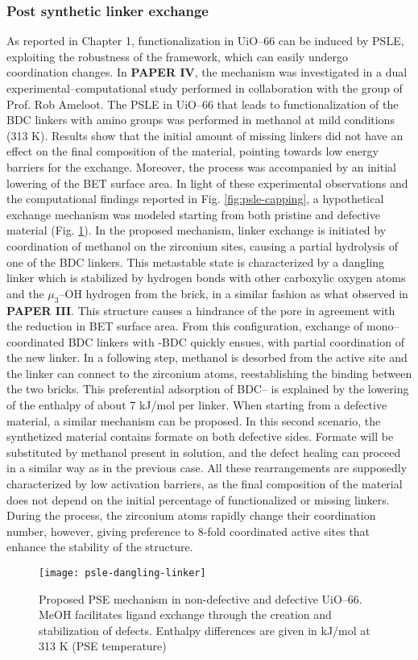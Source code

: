 \subsubsection*{Post synthetic linker exchange}
As reported in Chapter 1, functionalization in UiO--66 can be induced by PSLE, exploiting the robustness of the framework, which can easily undergo coordination changes. In \textbf{PAPER IV}, the mechanism was investigated in a dual experimental--computational study performed in collaboration with the group of Prof. Rob Ameloot. The PSLE in UiO--66 that leads to functionalization of the BDC linkers with amino groups was performed in methanol at mild conditions (313 K). Results show that the initial amount of missing linkers did not have an effect on the final composition of the material, pointing towards low energy barriers for the exchange. Moreover, the process was accompanied by an initial lowering of the BET surface area. 
\npar
In light of these experimental observations and the computational findings reported in Fig. \ref{fig:psle-capping}, a hypothetical exchange mechanism was modeled starting from both pristine and defective material (Fig. \ref{fig:psle-dangling-linker}). In the proposed mechanism, linker exchange is initiated by coordination of methanol on the zirconium sites, causing a partial hydrolysis of one of the BDC linkers. This metastable state is characterized by a dangling linker which is stabilized by hydrogen bonds with other carboxylic oxygen atoms and the $\mu_3$--OH hydrogen from the brick, in a similar fashion as what observed in \textbf{PAPER III}. This structure causes a hindrance of the pore in agreement with the reduction in BET surface area. From this configuration, exchange of mono--coordinated BDC linkers with -BDC quickly ensues, with partial coordination of the new linker. In a following step, methanol is desorbed from the active site and the linker can connect to the zirconium atoms, reestablishing the binding between the two bricks. This preferential adsorption of BDC-- is explained by the lowering of the enthalpy of about 7 kJ/mol per linker. When starting from a defective material, a similar mechanism can be proposed. In this second scenario, the synthetized material contains formate on both defective sides. Formate will be substituted by methanol present in solution, and the defect healing can proceed in a similar way as in the previous case. All these rearrangements are supposedly characterized by low activation barriers, as the final composition of the material does not depend on the initial percentage of functionalized or missing linkers. During the process, the zirconium atoms rapidly change their coordination number, however, giving preference to 8-fold coordinated active sites that enhance the stability of the structure. 
\begin{figure}[!htbp]
	\centering
	\texttt{[image: psle-dangling-linker]}
	\caption{Proposed PSE mechanism in non-defective and defective UiO--66. MeOH facilitates ligand exchange through the creation and stabilization of defects. Enthalpy differences are given in kJ/mol at 313 K (PSE temperature)}
	\label{fig:psle-dangling-linker}
\end{figure}

